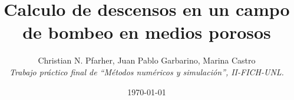 \documentclass[10pt,a4paper,final]{article}
\begin{document}
\title{Calculo de descensos en un campo de bombeo en medios porosos}
\author{Christian N. Pfarher, Juan Pablo Garbarino, Marina Castro\\
\textit{Trabajo práctico final de ``Métodos numéricos y simulación'', II-FICH-UNL.}}
\date{\today}
\maketitle
\newpage
\tableofcontents
\newpage
\end{document}
